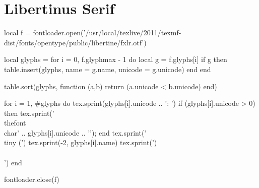 \documentclass[10pt,landscape]{article}
\begin{document}
\section*{Libertinus Serif}
\begin{multicols}{7}\noindent
\begin{luacode*}
local f = fontloader.open('/usr/local/texlive/2011/texmf-dist/fonts/opentype/public/libertine/fxlr.otf')

local glyphs = {}
for i = 0, f.glyphmax - 1 do
   local g = f.glyphs[i]
   if g then
       table.insert(glyphs, {name = g.name, unicode = g.unicode})
   end
end

table.sort(glyphs, function (a,b) return (a.unicode < b.unicode) end)

for i = 1, #glyphs do
   tex.sprint(glyphs[i].unicode .. ': ')
   if (glyphs[i].unicode > 0) then
       tex.sprint('{\\thefont\\char' .. glyphs[i].unicode .. '}');
   end
   tex.sprint(' {\\tiny (')
   tex.sprint(-2, glyphs[i].name)
   tex.sprint(')}\\\\')
end

fontloader.close(f)
\end{luacode*}
\end{multicols}
\end{document}
